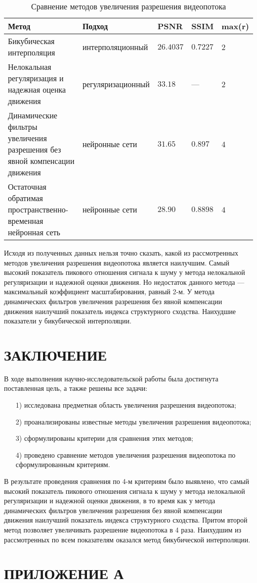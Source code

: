 \documentclass{bmstu}
\begin{document}
\begin{table}[H]
\caption{Сравнение методов увеличения разрешения видеопотока}
\label{tabular:comparison}
\begin{tabular}{|p{4cm}|p{4.25cm}|p{2cm}|p{2cm}|p{2cm}|}
\hline
\textbf{Метод} & \textbf{Подход} & \textbf{PSNR} & \textbf{SSIM} & \textbf{max(r)}
\tabularnewline
\hline
Бикубическая интерполяция & интерполяционный & $26.4037$ & $0.7227$ & 2
\tabularnewline
\hline
Нелокальная регуляризация и надежная оценка движения & регуляризационный & $33.18$ & --- & 2
\tabularnewline
\hline
Динамические фильтры увеличения разрешения без явной компенсации движения & нейронные сети & $31.65$ & $0.897$ & 4
\tabularnewline
\hline
Остаточная обратимая пространственно-временная нейронная сеть & нейронные сети & $28.90$ & $0.8898$ & 4
\tabularnewline
\hline
\end{tabular}
\end{table}

Исходя из полученных данных нельзя точно сказать, какой из рассмотренных методов увеличения разрешения видеопотока является наилучшим. 
Самый высокий показатель пикового отношения сигнала к шуму у метода нелокальной регуляризации и надежной оценки движения. 
Но недостаток данного метода --- максимальный коэффициент масштабирования, равный 2-м. 
У метода динамических фильтров увеличения разрешения без явной компенсации движения наилучший показатель индекса структурного сходства. 
Наихудшие показатели у бикубической интерполяции.

{\centering \chapter*{ЗАКЛЮЧЕНИЕ}}

В ходе выполнения научно-исследовательской работы была достигнута поставленная цель, а также решены все задачи:
\begin{enumerate}
\item[1)] исследована предметная область увеличения разрешения видеопотока;
\item[2)] проанализированы известные методы увеличения разрешения видеопотока;
\item[3)] сформулированы критерии для сравнения этих методов;
\item[4)] проведено сравнение методов увеличения разрешения видеопотока по сформулированным критериям.
\end{enumerate}

В результате проведения сравнения по 4-м критериям было выявлено, что самый высокий показатель пикового отношения сигнала к шуму у метода нелокальной регуляризации и надежной оценки движения, в то время как у метода динамических фильтров увеличения разрешения без явной компенсации движения наилучший показатель индекса структурного сходства. 
Притом второй метод позволяет увеличивать разрешение видеопотока в 4 раза. 
Наихудшим из рассмотренных по всем показателям оказался метод бикубической интерполяции.

{\centering {\center\printbibliography[title=СПИСОК ИСПОЛЬЗОВАННЫХ ИСТОЧНИКОВ]}}

{\centering \chapter*{ПРИЛОЖЕНИЕ А}}
\end{document}
